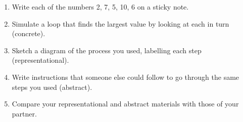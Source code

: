 \begin{enumerate}

\item
  Write each of the numbers 2, 7, 5, 10, 6 on a sticky note.

\item
  Simulate a loop that finds the largest value by looking at each in
  turn (concrete).

\item
  Sketch a diagram of the process you used, labelling each step
  (representational).

\item
  Write instructions that someone else could follow to go through the
  same steps you used (abstract).

\item
  Compare your representational and abstract materials with those of
  your partner.
  
\end{enumerate}

